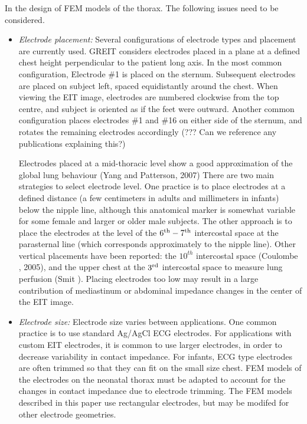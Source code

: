 \documentclass[12pt]{iopart}
\begin{document}
In the design of FEM models of the thorax. The
following issues need to be considered.
\begin{itemize}
\item
{\em Electrode placement:}
Several configurations of electrode types and placement
are currently used. GREIT considers electrodes placed
in a plane at a defined chest height perpendicular to 
the patient long axis. In the most common configuration,
Electrode \#1 is placed on the sternum. Subsequent
electrodes are placed on subject left, spaced equidistantly
around the chest. When viewing the EIT image, electrodes
are numbered clockwise from the top centre, and subject
is oriented as if the feet were outward. Another
common configuration places electrodes \#1 and \#16 on
either side of the sternum, and rotates the remaining 
electrodes accordingly (??? Can we reference any 
publications explaining this?)

\hspace{0.5cm}
Electrodes placed at a mid-thoracic level show a 
good approximation of the global lung behaviour
(Yang and Patterson, 2007)
There are two main strategies to select electrode
level.  One practice is to place
electrodes at a defined distance (a few centimeters 
in adults and millimeters in infants)
below the nipple line, although this anatomical
marker is somewhat variable for some female and
larger or older male subjects. 
The other approach is to 
place the electrodes at the level of the
$6^{\rm th} - 7^{\rm th}$ intercostal space at
the parasternal line (which corresponds approximately
to the nipple line). Other vertical placements have
been reported: the $10^{th}$ intercostal space 
(Coulombe \etal, 2005), and  
the upper chest at the $3^{\rm rd}$ intercostal space
to measure lung perfusion (Smit ).
Placing electrodes too low may result in a large
contribution of mediastinum or abdominal impedance
changes in the center of the EIT image.

\item
{\em Electrode size:}
Electrode size varies between applications. One common
practice is to use standard Ag/AgCl ECG electrodes.
For applications with custom EIT electrodes, it is
common to use larger electrodes, in order to decrease
variability in contact impedance. For infants, 
ECG type electrodes are often trimmed so that they
can fit on the small size chest. FEM models of
the electrodes on the neonatal thorax must be adapted
to account for the changes in contact impedance
due to electrode trimming. The FEM models described
in this paper use rectangular electrodes, but may be
modifed for other electrode geometries.


\end{itemize}
\end{document}
